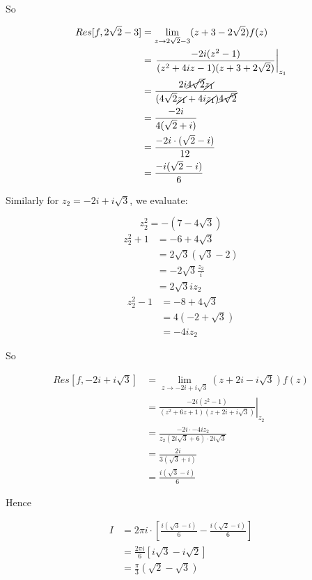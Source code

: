 \documentclass{../../physics_notes}
\begin{document}
\begin{example}{}
\begin{enumerate}
{ 	So

 	\begin{align*}
 		Res[f, 2\sqrt{2} - 3] &= \lim_{z\to 2\sqrt{2} - 3} (z + 3 - 2\sqrt{2})f(z) \\
 		&= \left.\frac{-2i(z^2 - 1)}{(z^2 + 4iz - 1)(z + 3 + 2\sqrt{2})}\right|_{z_1} \\
 		&= \frac{2i \cancel{4\sqrt{2}}\cancel{z_1}}{(4\sqrt{2}\cancel{z_1} + 4i\cancel{z_1})\cancel{4\sqrt{2}}} \\
 		&= \frac{-2i}{4(\sqrt{2} + i)} \\
 		&= \frac{-2i \cdot (\sqrt{2} - i)}{12} \\
 		&= \frac{-i(\sqrt{2} - i)}{6}
	\end{align*}

	Similarly for $z_2 = -2i + i\sqrt{3}$, we evaluate:

	\[
	 	z_2^2 = -(7-4\sqrt{3})
 	\] 
 	\begin{align*}
 		z_2^2 + 1 &= -6 + 4\sqrt{3} \\
 		&= 2\sqrt{3}(\sqrt{3} - 2) \\
 		&= -2\sqrt{3}\frac{z_2}{i} \\
 		&= 2\sqrt{3}iz_2
 	\end{align*}
 	\begin{align*}
 		z_2^2 - 1 &= -8 + 4\sqrt{3} \\
 		&= 4(-2 + \sqrt{3}) \\
 		&= -4iz_2
 	\end{align*}

 	So 

 	\begin{align*}
 	Res[f,-2i + i\sqrt{3}] &= \lim_{z\to -2i + i\sqrt{3}} (z + 2i - i\sqrt{3})f(z) \\
 	&= \left.\frac{-2i(z^2 - 1)}{(z^2 + 6z + 1)(z + 2i + i\sqrt{3})}\right|_{z_2} \\
 	&= \frac{-2i \cdot -4iz_2}{z_2 (2i\sqrt{3} + 6)\cdot 2i\sqrt{3}} \\
 	&= \frac{2i}{3(\sqrt{3} + i)} \\
 	&= \frac{i(\sqrt{3} - i)}{6}
 	\end{align*}

 	Hence 

 	\begin{align*}
 	I &= 2\pi i \cdot \left[\frac{i(\sqrt{3} - i)}{6} - \frac{i(\sqrt{2}-i)}{6}\right] \\
 	&= \frac{2\pi i}{6}\left[i\sqrt{3} - i\sqrt{2}\right] \\
 	&= \frac{\pi}{3}(\sqrt{2} - \sqrt{3})
 	\end{align*}
}

\end{enumerate}
\end{example}
\end{document}
